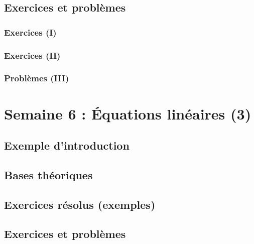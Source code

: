 \documentclass[
  12pt,
]{book}
\begin{document}
\hypertarget{exercices-et-probluxe8mes-4}{%
\section{Exercices et problèmes}\label{exercices-et-probluxe8mes-4}}

\hypertarget{exercices-i-4}{%
\subsection{Exercices (I)}\label{exercices-i-4}}

\hypertarget{exercices-ii-4}{%
\subsection{Exercices (II)}\label{exercices-ii-4}}

\hypertarget{probluxe8mes-iii-4}{%
\subsection{Problèmes (III)}\label{probluxe8mes-iii-4}}

\hypertarget{semaine-6-uxe9quations-linuxe9aires-3}{%
\chapter{Semaine 6 : Équations linéaires (3)}\label{semaine-6-uxe9quations-linuxe9aires-3}}

\hypertarget{exemple-dintroduction-5}{%
\section{Exemple d'introduction}\label{exemple-dintroduction-5}}

\hypertarget{bases-thuxe9oriques-5}{%
\section{Bases théoriques}\label{bases-thuxe9oriques-5}}

\hypertarget{exercices-ruxe9solus-exemples-5}{%
\section{Exercices résolus (exemples)}\label{exercices-ruxe9solus-exemples-5}}

\hypertarget{exercices-et-probluxe8mes-5}{%
\section{Exercices et problèmes}\label{exercices-et-probluxe8mes-5}}
\end{document}
